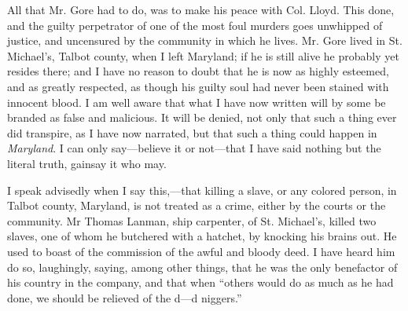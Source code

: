 All that Mr. Gore had to do, was to make his peace with Col. Lloyd. This
done, and the guilty perpetrator of one of the most foul murders goes
unwhipped of justice, and uncensured by the community in which he lives.
Mr. Gore lived in St. Michael's, Talbot county, when I left Maryland; if
he is still alive he probably yet resides there; and I have no reason to
doubt that he is now as highly esteemed, and as greatly respected, as
though his guilty soul had never been stained with innocent blood. I am
well aware that what I have now written will by some be branded as false
and malicious. It will be denied, not only that such a thing ever did
transpire, as I have now narrated, but that such a thing could happen in
\emph{Maryland}. I can only say---believe it or not---that I have said
nothing but the literal truth, gainsay it who may.

I speak advisedly when I say this,---that killing a slave, or any
colored person, in Talbot county, Maryland, is not treated as a crime,
either by the courts or the community. Mr Thomas Lanman, ship carpenter,
{}of St. Michael's, killed two slaves, one of whom he butchered with a
hatchet, by knocking his brains out. He used to boast of the commission
of the awful and bloody deed. I have heard him do so, laughingly,
saying, among other things, that he was the only benefactor of his
country in the company, and that when ``others would do as much as he
had done, we should be relieved of the d---d niggers.''

